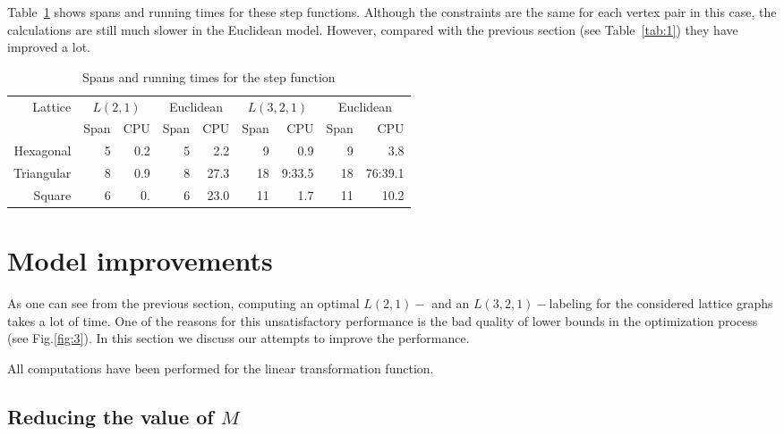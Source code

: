 \documentclass[smallextended]{svjour3}
\begin{document}
Table~\ref{tab:3} shows spans and running times for these step functions. 
Although the constraints are the same for each vertex pair in this case, the calculations 
are still much slower in the Euclidean model. However, compared with the 
previous section (see Table~\ref{tab:1}) they have improved a lot. 

\begin{table}[h] 
\begin{center} 
\renewcommand{\arraystretch}{1.3} 
\renewcommand{\tabcolsep}{8pt} 
\begin{tabular}{|r||r|r|r|r||r|r|r|r|} 
\hline 
Lattice  & \multicolumn{2}{c|}{$L(2,1)$} & \multicolumn{2}{c||}{Euclidean} & 
 \multicolumn{2}{c|}{$L(3,2,1)$} & \multicolumn{2}{c|}{Euclidean}\\ 
  & Span & CPU & Span & CPU & Span & CPU & Span & CPU\\ 
\hline 
Hexagonal & 5 & 0.2 & 5 & 2.2 & 9 & 0.9 & 9 & 3.8 \\ 
\hline 
Triangular  & 8 & 0.9 & 8 & 27.3 & 18 & 9:33.5 & 18 & 76:39.1 \\ 
\hline 
Square     & 6 & 0. & 6  & 23.0 & 11 & 1.7 & 11 & 10.2  \\ 
\hline 
\end{tabular} 
\end{center} 
\caption{Spans and running times for the step function}\label{tab:3} 
\end{table} 

\section{Model improvements} 

As one can see from the previous section, computing an optimal $L(2,1)-$ and an $L(3,2,1)-$labeling for the considered lattice graphs takes a lot of time. One 
of the reasons for this unsatisfactory performance is the bad quality of lower bounds in the optimization process (see Fig.\ref{fig:3}). In this section we discuss our attempts to improve the performance. 

All computations have been performed for the linear transformation function. 

 

\FloatBarrier 

\subsection{Reducing the value of $M$} 
\end{document}
